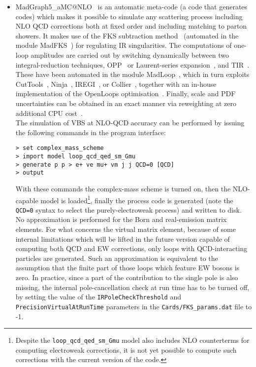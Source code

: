 \begin{itemize}
  \item {\sc MadGraph5\_aMC@NLO}~\cite{Alwall:2014hca} is an automatic meta-code (a code that generates codes) which makes it possible to simulate any scattering process
      including NLO QCD corrections both at fixed order and including matching to parton showers. It makes use of the FKS subtraction method~\cite{Frixione:1995ms,
        Frixione:1997np} (automated in the module {\sc MadFKS}~\cite{Frederix:2009yq,
        Frederix:2016rdc}) for regulating IR singularities. The computations of one-loop amplitudes are carried out by switching dynamically between
        two integral-reduction techniques, OPP~\cite{Ossola:2006us} or Laurent-series expansion~\cite{Mastrolia:2012bu},
        and TIR~\cite{Passarino:1978jh,Davydychev:1991va,Denner:2005nn}. These have been automated in the module {\sc MadLoop}~\cite{Hirschi:2011pa}, which
        in turn exploits {\sc CutTools}~\cite{Ossola:2007ax}, {\sc Ninja}~\cite{Peraro:2014cba,
        Hirschi:2016mdz}, {\sc IREGI}~\cite{ShaoIREGI}, or {\sc Collier}~\cite{Denner:2016kdg}, together with an in-house 
        implementation of the {\sc OpenLoops} optimisation~\cite{Cascioli:2011va}. Finally, scale and PDF uncertainties can be obtained in an exact manner via reweighting
        at zero additional CPU cost~\cite{Frederix:2011ss}.\\
        The simulation of VBS at NLO-QCD accuracy can be performed by issuing the following commands in the program interface:
\begin{verbatim}
> set complex_mass_scheme
> import model loop_qcd_qed_sm_Gmu
> generate p p > e+ ve mu+ vm j j QCD=0 [QCD]
> output
\end{verbatim}
  With these commands the complex-mass scheme is turned on, then the NLO-capable model is loaded\footnote{Despite
            the {\tt loop\_qcd\_qed\_sm\_Gmu} model also includes NLO counterterms for computing electroweak corrections, it is not yet possible to compute such corrections
        with the current version of the code.}, finally the process code is generated (note the {\tt QCD=0} syntax to select the purely-electroweak process)
        and written to disk. No approximation is performed for the Born and real-emission matrix elements. 
        For what concerns the virtual matrix element, because of some internal limitations which will be lifted in the future version capable of computing both QCD and EW corrections,
        only loops with QCD-interacting particles are generated. Such an approximation is equivalent to the assumption that the finite part of
        those loops which feature EW bosons is zero. In practice, since a part of the contribution to the single pole is also missing, the internal 
        pole-cancellation check at run time has to be turned off, by setting the value of the {\tt IR\-Pole\-Check\-Threshold} and 
        {\tt Precision\-Virtual\-At\-Run\-Time} parameters in the {\tt Cards\-/FKS\_\-params.dat} file to -1.


\end{itemize}

